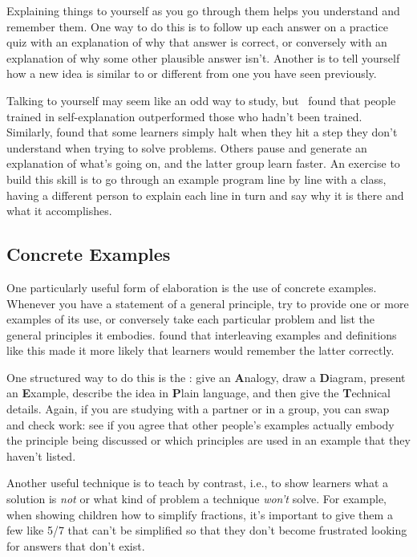 Explaining things to yourself as you go through them
helps you understand and remember them.
One way to do this is to follow up each answer on a practice quiz
with an explanation of why that answer is correct,
or conversely with an explanation of why some other plausible answer isn't.
Another is to tell yourself
how a new idea is similar to or different from one you have seen previously.

Talking to yourself may seem like an odd way to study,
but~\cite{Biel1995} found that
people trained in self-explanation outperformed those who hadn't been trained.
Similarly,
\cite{Chi1989} found that some learners simply halt when they hit a step they don't understand
when trying to solve problems.
Others pause and generate an explanation of what's going on,
and the latter group learn faster.
An exercise to build this skill is to go through an example program line by line with a class,
having a different person to explain each line in turn
and say why it is there and what it accomplishes.

\subsection*{Concrete Examples}

One particularly useful form of elaboration is the use of concrete examples.
Whenever you have a statement of a general principle,
try to provide one or more examples of its use,
or conversely take each particular problem and list the general principles it embodies.
\cite{Raws2014} found that interleaving examples and definitions like this
made it more likely that learners would remember the latter correctly.

One structured way to do this is
the :
give an \textbf{A}nalogy,
draw a \textbf{D}iagram,
present an \textbf{E}xample,
describe the idea in \textbf{P}lain language,
and then give the \textbf{T}echnical details.
Again,
if you are studying with a partner or in a group,
you can swap and check work:
see if you agree that other people's examples actually embody the principle being discussed
or which principles are used in an example that they haven't listed.

Another useful technique is to teach by contrast,
i.e.,
to show learners what a solution is \emph{not}
or what kind of problem a technique \emph{won't} solve.
For example,
when showing children how to simplify fractions,
it's important to give them a few like 5/7 that can't be simplified
so that they don't become frustrated looking for answers that don't exist.

